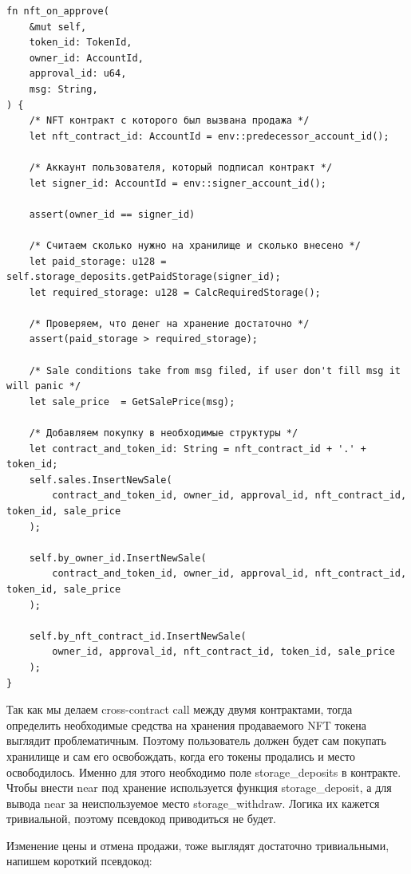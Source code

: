 \begin{verbatim}
fn nft_on_approve(
    &mut self,
    token_id: TokenId,
    owner_id: AccountId,
    approval_id: u64,
    msg: String,
) {
    /* NFT контракт с которого был вызвана продажа */
    let nft_contract_id: AccountId = env::predecessor_account_id();

    /* Аккаунт пользователя, который подписал контракт */
    let signer_id: AccountId = env::signer_account_id();

    assert(owner_id == signer_id)

    /* Считаем сколько нужно на хранилище и сколько внесено */
    let paid_storage: u128 = self.storage_deposits.getPaidStorage(signer_id);
    let required_storage: u128 = CalcRequiredStorage();

    /* Проверяем, что денег на хранение достаточно */
    assert(paid_storage > required_storage);

    /* Sale conditions take from msg filed, if user don't fill msg it will panic */
    let sale_price  = GetSalePrice(msg);

    /* Добавляем покупку в необходимые структуры */
    let contract_and_token_id: String = nft_contract_id + '.' + token_id;
    self.sales.InsertNewSale(
        contract_and_token_id, owner_id, approval_id, nft_contract_id, token_id, sale_price
    );

    self.by_owner_id.InsertNewSale(
        contract_and_token_id, owner_id, approval_id, nft_contract_id, token_id, sale_price
    );

    self.by_nft_contract_id.InsertNewSale(
        owner_id, approval_id, nft_contract_id, token_id, sale_price
    );
}
\end{verbatim}

Так как мы делаем cross-contract call между двумя контрактами, тогда определить необходимые средства на хранения продаваемого NFT токена выглядит проблематичным.
Поэтому пользователь должен будет сам покупать хранилище и сам его освобождать, когда его токены продались и место освободилось. Именно для этого необходимо поле storage\_deposits в контракте.
Чтобы внести near под хранение используется функция storage\_deposit, а для вывода near за неиспользуемое место storage\_withdraw. Логика их кажется тривиальной, поэтому псевдокод приводиться не будет.

Изменение цены и отмена продажи, тоже выглядят достаточно тривиальными, напишем короткий псевдокод:

